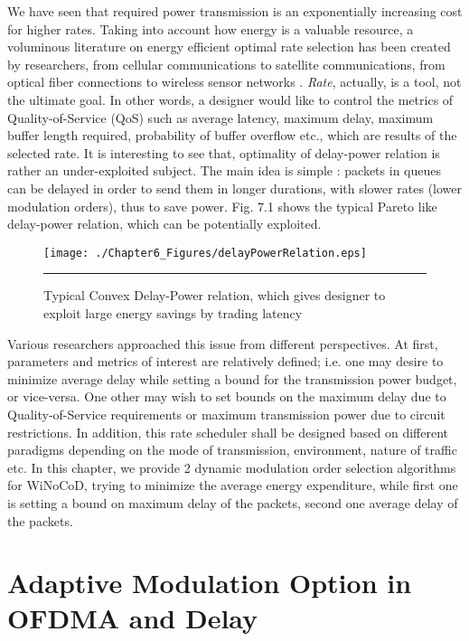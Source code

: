 We have seen that required power transmission is an exponentially increasing cost for higher rates. Taking into account how energy is a valuable resource, a voluminous literature on energy efficient optimal rate selection has been created by researchers, from cellular communications to satellite communications, from optical fiber connections to wireless sensor networks \cite{bandyopadhyay2003energy}\cite{fu2003optimal}\cite{zhang2010energy}\cite{berggren2004energy}. \textit{Rate}, actually, is a tool, not the ultimate goal. In other words, a designer would like to control the metrics of Quality-of-Service (QoS) such as average latency, maximum delay, maximum buffer length required, probability of buffer overflow etc., which are results of the selected rate. It is interesting to see that, optimality of delay-power relation is rather an under-exploited subject. The main idea is simple : packets in queues can be delayed in order to send them in longer durations, with slower rates (lower modulation orders), thus to save power. Fig. 7.1 shows the typical Pareto like delay-power relation, which can be potentially exploited.


\begin{figure}[htbp]
  \centering
    \texttt{[image: ./Chapter6\_Figures/delayPowerRelation.eps]}
    \rule{35em}{0.5pt}
  \caption[Typical Convex Delay-Power relation]{Typical Convex Delay-Power relation, which gives designer to exploit large energy savings by trading latency} 
  \label{fig:Electron}
\end{figure}



Various researchers approached this issue from different perspectives. At first, parameters and metrics of interest are relatively defined; i.e. one may desire to minimize average delay while setting a bound for the transmission power budget, or vice-versa. One other may wish to set bounds on the maximum delay due to Quality-of-Service requirements or maximum transmission power due to circuit restrictions. In addition, this rate scheduler shall be designed based on different paradigms depending on the mode of transmission, environment, nature of traffic etc. In this chapter, we provide 2 dynamic modulation order selection algorithms for WiNoCoD, trying to minimize the average energy expenditure, while first one is setting a bound on maximum delay of the packets, second one average delay of the packets. 

\section{Adaptive Modulation Option in OFDMA and Delay }

